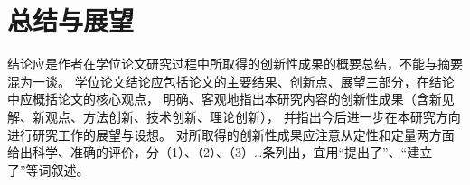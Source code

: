 

\chapter{总结与展望}

结论应是作者在学位论文研究过程中所取得的创新性成果的概要总结，不能与摘要混为一谈。
学位论文结论应包括论文的主要结果、创新点、展望三部分，在结论中应概括论文的核心观点，
明确、客观地指出本研究内容的创新性成果（含新见解、新观点、方法创新、技术创新、理论创新），
并指出今后进一步在本研究方向进行研究工作的展望与设想。
对所取得的创新性成果应注意从定性和定量两方面给出科学、准确的评价，分（1）、（2）、（3）…条列出，宜用“提出了”、“建立了”等词叙述。


